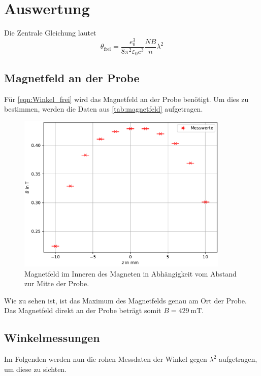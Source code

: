 


\section{Auswertung}
\label{sec:Auswertung}

%
%
%
Die Zentrale Gleichung lautet 
\begin{equation}
    \theta_\text{frei} = \frac{e_0^3}{8 \pi ^2 \varepsilon_0c^3} \frac{NB}{n} \lambda ^2
    \label{eqn:Winkel_frei}
\end{equation}
%
%
%
%

\subsection{Magnetfeld an der Probe}
\noindent Für \autoref{eqn:Winkel_frei} wird das Magnetfeld an der Probe benötigt. Um dies zu bestimmen, 
werden die Daten aus \autoref{tab:magnetfeld} aufgetragen.

\begin{figure}[H]
    \centering
    \includegraphics[width = 0.9\textwidth]{../Magnetfeld.pdf}
    \caption{Magnetfeld im Inneren des Magneten in Abhängigkeit vom Abstand zur Mitte der Probe.}
    \label{fig:magnetfeld}
\end{figure}

\noindent Wie zu sehen ist, ist das Maximum des Magnetfelds genau am Ort der Probe. Das Magnetfeld 
direkt an der Probe beträgt somit 
%
%
$B=\qty{429}{\milli \tesla}$.
%
%
%

\subsection{Winkelmessungen}
\noindent Im Folgenden werden nun die rohen Messdaten der Winkel gegen $\lambda^2$ aufgetragen, um diese 
zu sichten.

